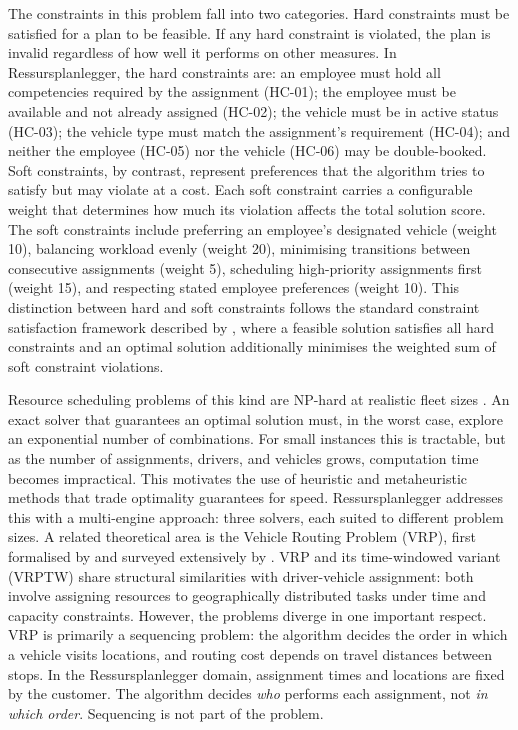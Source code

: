 The constraints in this problem fall into two categories. Hard constraints must be satisfied for a plan to be feasible. If any hard constraint is violated, the plan is invalid regardless of how well it performs on other measures. In Ressursplanlegger, the hard constraints are: an employee must hold all competencies required by the assignment (HC-01); the employee must be available and not already assigned (HC-02); the vehicle must be in active status (HC-03); the vehicle type must match the assignment's requirement (HC-04); and neither the employee (HC-05) nor the vehicle (HC-06) may be double-booked. Soft constraints, by contrast, represent preferences that the algorithm tries to satisfy but may violate at a cost. Each soft constraint carries a configurable weight that determines how much its violation affects the total solution score. The soft constraints include preferring an employee's designated vehicle (weight 10), balancing workload evenly (weight 20), minimising transitions between consecutive assignments (weight 5), scheduling high-priority assignments first (weight 15), and respecting stated employee preferences (weight 10). This distinction between hard and soft constraints follows the standard constraint satisfaction framework described by \textcite{rossi2006handbook}, where a feasible solution satisfies all hard constraints and an optimal solution additionally minimises the weighted sum of soft constraint violations.

Resource scheduling problems of this kind are NP-hard at realistic fleet sizes \parencite{pinedo2016scheduling}. An exact solver that guarantees an optimal solution must, in the worst case, explore an exponential number of combinations. For small instances this is tractable, but as the number of assignments, drivers, and vehicles grows, computation time becomes impractical. This motivates the use of heuristic and metaheuristic methods that trade optimality guarantees for speed. Ressursplanlegger addresses this with a multi-engine approach: three solvers, each suited to different problem sizes. A related theoretical area is the Vehicle Routing Problem (VRP), first formalised by \textcite{dantzig1959truck} and surveyed extensively by \textcite{toth2014vrp}. VRP and its time-windowed variant (VRPTW) share structural similarities with driver-vehicle assignment: both involve assigning resources to geographically distributed tasks under time and capacity constraints. However, the problems diverge in one important respect. VRP is primarily a sequencing problem: the algorithm decides the order in which a vehicle visits locations, and routing cost depends on travel distances between stops. In the Ressursplanlegger domain, assignment times and locations are fixed by the customer. The algorithm decides \emph{who} performs each assignment, not \emph{in which order}. Sequencing is not part of the problem.

